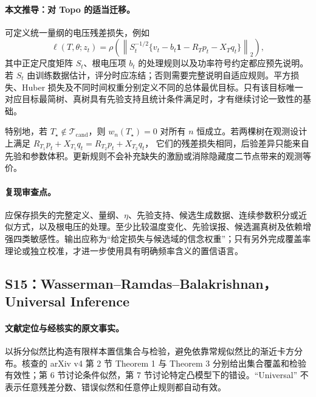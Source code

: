 \documentclass[UTF8,11pt,fontset=fandol]{ctexart}
\theoremstyle{remark}
\numberwithin{equation}{section}
\begin{document}
\paragraph{本文推导：对 Topo 的适当迁移。}
可定义统一量纲的电压残差损失，例如
\[
 \ell(T,\theta;z_t)
 =\rho\!\left(
 \left\|S_t^{-1/2}\{v_t-b_t\mathbf1-R_Tp_t-X_Tq_t\}\right\|_2
 \right),
\]
其中正定尺度矩阵 $S_t$、根电压项 $b_t$ 的处理规则以及功率符号约定都应预先说明。若 $S_t$ 由训练数据估计，评分时应冻结；否则需要完整说明自适应规则。平方损失、Huber 损失及不同时间权重分别定义不同的总体最优目标。只有该目标唯一对应目标最简树、真树具有先验支持且统计条件满足时，才有继续讨论一致性的基础。

特别地，若 $T_\star\notin\mathcal T_{\mathrm{cand}}$，则
$w_n(T_\star)=0$ 对所有 $n$ 恒成立。若两棵树在观测设计上满足
$R_{T_1}p_t+X_{T_1}q_t=R_{T_2}p_t+X_{T_2}q_t$，
它们的残差损失相同，后验差异只能来自先验和参数体积。更新规则不会补充缺失的激励或消除隐藏度二节点带来的观测等价。

\paragraph{复现审查点。}
应保存损失的完整定义、量纲、$\eta$、先验支持、候选生成数据、连续参数积分或近似方式，以及根电压的处理。至少比较温度变化、先验误报、候选漏真树及依赖增强四类敏感性。输出应称为“给定损失与候选域的信念权重”；只有另外完成覆盖率理论或独立校准，才进一步使用具有明确频率含义的置信语言。

\subsection{S15：Wasserman--Ramdas--Balakrishnan，Universal Inference}
\label{subsec:S15}

\paragraph{文献定位与经核实的原文事实。}
\citet{S15} 以拆分似然比构造有限样本置信集合与检验，避免依靠常规似然比的渐近卡方分布。核查的 arXiv v4 第 2 节 Theorem 1 与 Theorem 3 分别给出集合覆盖和检验有效性；第 6 节讨论条件似然，第 7 节讨论特定凸模型下的错设。“Universal” 不表示任意残差分数、错误似然和任意停止规则都自动有效。
\end{document}
